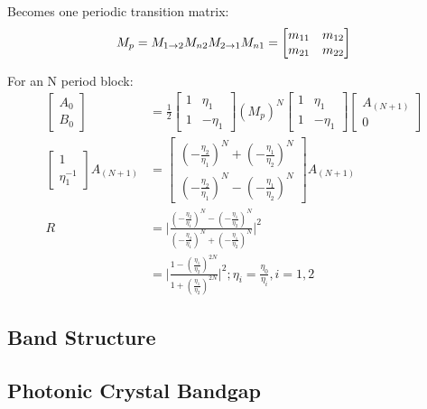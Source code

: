 Becomes one periodic transition matrix:
\begin{equation*}
	M_p = M_{1\rightarrow2}M_{n2}M_{2\rightarrow1}M_{n1} = \begin{bmatrix}m_{11} & m_{12}\\m_{21} & m_{22}\end{bmatrix}\\ 	
\end{equation*}

For an N period block:
\begin{equation*}
	\begin{aligned}
		\begin{bmatrix}A_0\\B_0 \end{bmatrix} 
		&=\frac{1}{2}\begin{bmatrix}1 & \eta_1\\1 & -\eta_1\end{bmatrix} 
		(M_p)^N 
		\begin{bmatrix}1 & \eta_1\\1 & -\eta_1\end{bmatrix}\begin{bmatrix}A_{(N+1)}\\0\end{bmatrix}\\
		\begin{bmatrix}1 \\\eta_1^{-1}\end{bmatrix}A_{(N+1)}
		&= \begin{bmatrix}(-\frac{\eta_2}{\eta_1})^N+(-\frac{\eta_1}{\eta_2})^N \\ (-\frac{\eta_2}{\eta_1})^N-(-\frac{\eta_1}{\eta_2})^N\end{bmatrix}A_{(N+1)}\\
		R &= \Bigg|\frac{(-\frac{\eta_2}{\eta_1})^N-(-\frac{\eta_1}{\eta_2})^N}{(-\frac{\eta_2}{\eta_1})^N+(-\frac{\eta_1}{\eta_2})^N}\Bigg|^2\\
		&=\Bigg|\frac{1-(\frac{\eta_1}{\eta_2})^{2N}}{1+(\frac{\eta_1}{\eta_2})^{2N}}\Bigg|^2; \eta_i = \frac{\eta_0}{\eta_i}, i = 1, 2
	\end{aligned}
\end{equation*}

\subsection{Band Structure}

\subsection{Photonic Crystal Bandgap}



